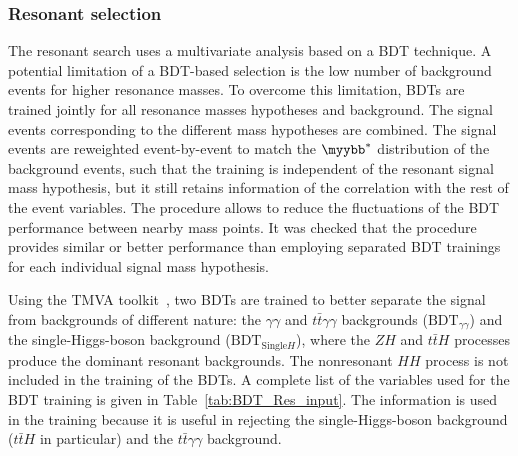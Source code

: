 \documentclass[PAPER, cernpreprint, texlive=2016, paper=a4, USenglish, texmf]{atlasdoc}
\begin{document}
\subsubsection{Resonant selection}
The resonant search uses a multivariate analysis based on a BDT technique.
A potential limitation of a BDT-based selection is the low number of background events for higher resonance masses. To overcome this limitation, BDTs are trained jointly for all resonance masses hypotheses and background. The signal events corresponding to the different mass hypotheses are combined.
The signal events are reweighted event-by-event to match the $\myybb^{*}$ distribution of the background events, such that the training is independent of the resonant signal mass hypothesis, but it still retains information of the correlation with the rest of the event variables. The procedure allows to reduce the fluctuations of the BDT performance between nearby mass points. It was checked that the procedure provides similar or better performance than employing separated BDT trainings for each individual signal mass hypothesis.
 
Using the TMVA toolkit~\cite{TMVA}, two BDTs are trained to better separate the signal from backgrounds of different nature: the $\gamma\gamma$ and $t\bar{t}\gamma\gamma$ backgrounds ($\textrm{BDT}_{\gamma\gamma}$) and the single-Higgs-boson background ($\textrm{BDT}_{\mathrm{Single} H}$), where the $ZH$ and $t\bar{t}H$ processes produce the dominant resonant backgrounds. The nonresonant $HH$ process is not included in the training of the BDTs.
A complete list of the variables used for the BDT training is given in Table~\ref{tab:BDT_Res_input}.
The \etmiss{} information is used in the training because it is useful in rejecting the single-Higgs-boson background ($t\bar{t}H$ in particular) and the $t\bar{t} \gamma \gamma$ background.
 
\end{document}

